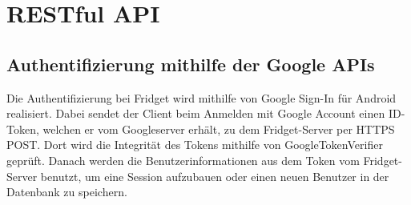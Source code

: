\documentclass[a4paper]{scrreprt}
\begin{document}
    \chapter{RESTful API}
    \section{Authentifizierung mithilfe der Google APIs}
    Die Authentifizierung bei Fridget wird mithilfe von Google Sign-In für Android realisiert. Dabei sendet der Client beim Anmelden mit Google Account einen ID-Token, welchen er vom Googleserver erhält, zu dem Fridget-Server per HTTPS POST. Dort wird die Integrität des Tokens mithilfe von GoogleTokenVerifier geprüft. Danach werden die Benutzerinformationen aus dem Token vom Fridget-Server benutzt, um eine Session aufzubauen oder einen neuen Benutzer in der Datenbank zu speichern.
    
    \newpage
\end{document}
